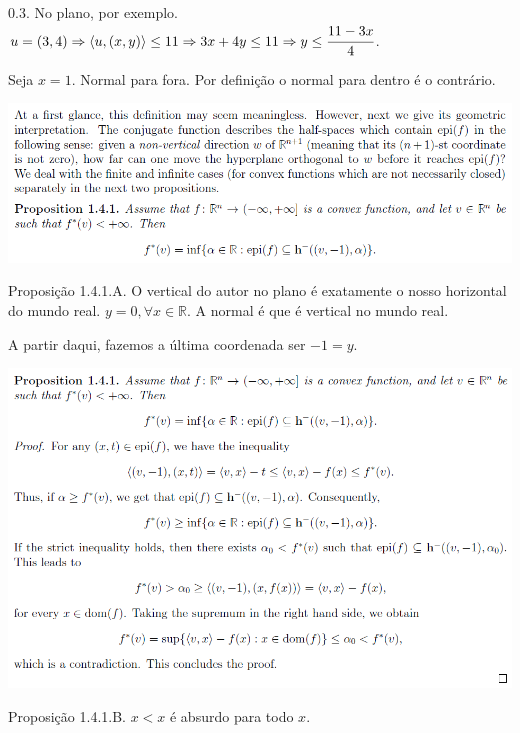 \documentclass[12pt]{article}
\begin{document}
0.3. No plano, por exemplo. $u = (3, 4) \Rightarrow \langle u, (x,y)\rangle \le 11 \Rightarrow 3x + 4y \le 11 \Rightarrow y \le \cfrac{11 - 3x}{4}$.

Seja $x = 1$. Normal para fora. Por defini\c{c}\~ao o normal para dentro \'e o contr\'ario.

\vspace{300mm}

		\begin{center}
		\includegraphics[scale=1.25]{2b}
		\end{center}

Proposi\c{c}\~ao 1.4.1.A. O vertical do autor no plano \'e exatamente o nosso horizontal do mundo real. $y = 0, \forall x\in \mathbb{R}$. A normal \'e que \'e vertical no mundo real.

A partir daqui, fazemos a \'ultima coordenada ser $-1 = y$.

\vspace{300mm}

		\begin{center}
		\includegraphics{3}
		\end{center}

Proposi\c{c}\~ao 1.4.1.B. $x < x$ \'e absurdo para todo $x$.

\vspace{300mm}
\end{document}
